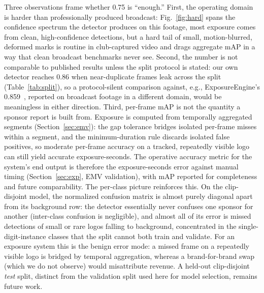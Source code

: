 \documentclass[conference,a4paper]{IEEEtran}
\begin{document}
Three observations frame whether 0.75 is ``enough.'' First, the operating domain is
harder than professionally produced broadcast: Fig.~\ref{fig:hard} spans the
confidence spectrum the detector produces on this footage, most exposure comes from
clean, high-confidence detections, but a hard tail of small, motion-blurred, deformed
marks is routine in club-captured video and drags aggregate mAP in a way that clean
broadcast benchmarks never see. Second, the number is not comparable to
published results unless the split protocol is stated: our own detector reaches 0.86
when near-duplicate frames leak across the split (Table~\ref{tab:split}), so a
protocol-silent comparison against, e.g., ExposureEngine's
0.859~\cite{exposureengine}, reported on broadcast footage in a different domain,
would be meaningless in either
direction. Third, per-frame mAP is not the quantity a sponsor report is built from.
Exposure is computed from temporally aggregated segments (Section~\ref{sec:emv}): the gap
tolerance bridges isolated per-frame misses within a segment, and the
minimum-duration rule discards isolated false positives, so moderate per-frame
accuracy on a tracked, repeatedly visible logo can still yield accurate
exposure-seconds. The operative accuracy metric for the system's end output is
therefore the exposure-seconds error against manual timing (Section~\ref{sec:exp}, EMV
validation), with mAP reported for completeness and future comparability. The
per-class picture reinforces this. On the clip-disjoint model, the normalized
confusion matrix is almost purely diagonal apart from its background row: the detector
essentially never confuses one sponsor for another (inter-class confusion is
negligible), and almost all of its error is missed detections of small or rare logos
falling to background, concentrated in the single-digit-instance classes that the
split cannot both train and validate. For an exposure system this is the benign error
mode: a missed frame on a repeatedly visible logo is bridged by temporal aggregation,
whereas a brand-for-brand swap (which we do not observe) would misattribute revenue. A
held-out clip-disjoint \emph{test} split, distinct from the validation split used here
for model selection, remains future work.
\end{document}
